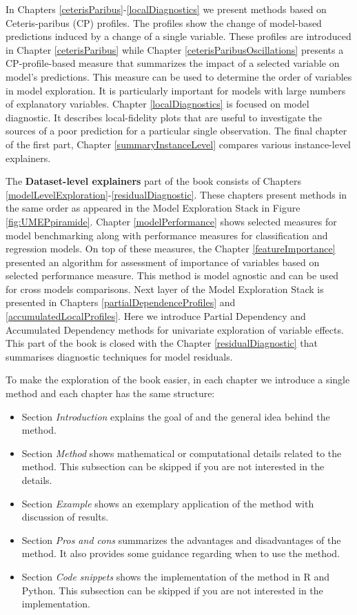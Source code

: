 \documentclass[]{krantz}
\providecommand{\tightlist}{%
  \setlength{\itemsep}{0pt}\setlength{\parskip}{0pt}}
\begin{document}
In Chapters \ref{ceterisParibus}-\ref{localDiagnostics} we present methods based on Ceteris-paribus (CP) profiles. The profiles show the change of model-based predictions induced by a change of a single variable. These profiles are introduced in Chapter \ref{ceterisParibus} while Chapter \ref{ceterisParibusOscillations} presents a CP-profile-based measure that summarizes the impact of a selected variable on model's predictions. This measure can be used to determine the order of variables in model exploration. It is particularly important for models with large numbers of explanatory variables. Chapter \ref{localDiagnostics} is focused on model diagnostic. It describes local-fidelity plots that are useful to investigate the sources of a poor prediction for a particular single observation.
The final chapter of the first part, Chapter \ref{summaryInstanceLevel} compares various instance-level explainers.

The \textbf{Dataset-level explainers} part of the book consists of Chapters \ref{modelLevelExploration}-\ref{residualDiagnostic}. These chapters present methods in the same order as appeared in the Model Exploration Stack in Figure \ref{fig:UMEPpiramide}.
Chapter \ref{modelPerformance} shows selected measures for model benchmarking along with performance measures for classification and regression models.
On top of these measures, the Chapter \ref{featureImportance} presented an algorithm for assessment of importance of variables based on selected performance measure. This method is model agnostic and can be used for cross models comparisons.
Next layer of the Model Exploration Stack is presented in Chapters \ref{partialDependenceProfiles} and \ref{accumulatedLocalProfiles}. Here we introduce Partial Dependency and Accumulated Dependency methods for univariate exploration of variable effects.
This part of the book is closed with the Chapter \ref{residualDiagnostic} that summarises diagnostic techniques for model residuals.

To make the exploration of the book easier, in each chapter we introduce a single method and each chapter has the same structure:

\begin{itemize}
\tightlist
\item
  Section \emph{Introduction} explains the goal of and the general idea behind the method.
\item
  Section \emph{Method} shows mathematical or computational details related to the method. This subsection can be skipped if you are not interested in the details.
\item
  Section \emph{Example} shows an exemplary application of the method with discussion of results.
\item
  Section \emph{Pros and cons} summarizes the advantages and disadvantages of the method. It also provides some guidance regarding when to use the method.
\item
  Section \emph{Code snippets} shows the implementation of the method in R and Python. This subsection can be skipped if you are not interested in the implementation.
\end{itemize}
\end{document}
